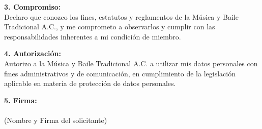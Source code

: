 \documentclass[a4paper,12pt]{article}
\begin{document}
\vspace{0.5cm}

\noindent
\textbf{3. Compromiso:} \\
Declaro que conozco los fines, estatutos y reglamentos de la Música y Baile Tradicional A.C., y me comprometo a observarlos y cumplir con las responsabilidades inherentes a mi condición de miembro.

\vspace{0.5cm}

\noindent
\textbf{4. Autorización:} \\
Autorizo a la Música y Baile Tradicional A.C. a utilizar mis datos personales con fines administrativos y de comunicación, en cumplimiento de la legislación aplicable en materia de protección de datos personales.

\vspace{1cm}

\noindent
\textbf{5. Firma:} \\
\underline{\hspace{10cm}} \hfill  \\
(Nombre y Firma del solicitante) 
\end{document}
